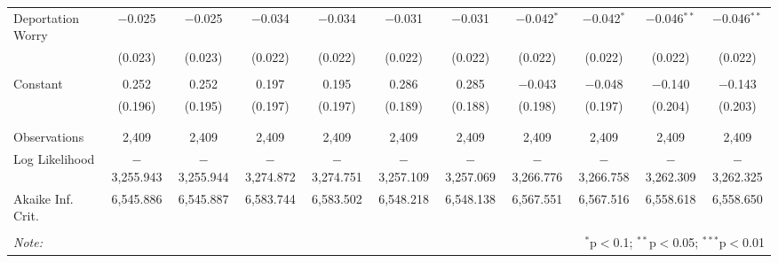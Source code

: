 \begin{table}[!htbp]
\begin{tabular}{@{\extracolsep{5pt}}lcccccccccc}
 Deportation Worry & $-$0.025 & $-$0.025 & $-$0.034 & $-$0.034 & $-$0.031 & $-$0.031 & $-$0.042$^{*}$ & $-$0.042$^{*}$ & $-$0.046$^{**}$ & $-$0.046$^{**}$ \\ 
  & (0.023) & (0.023) & (0.022) & (0.022) & (0.022) & (0.022) & (0.022) & (0.022) & (0.022) & (0.022) \\ 
  & & & & & & & & & & \\ 
 Constant & 0.252 & 0.252 & 0.197 & 0.195 & 0.286 & 0.285 & $-$0.043 & $-$0.048 & $-$0.140 & $-$0.143 \\ 
  & (0.196) & (0.195) & (0.197) & (0.197) & (0.189) & (0.188) & (0.198) & (0.197) & (0.204) & (0.203) \\ 
  & & & & & & & & & & \\ 
\hline \\[-1.8ex] 
Observations & 2,409 & 2,409 & 2,409 & 2,409 & 2,409 & 2,409 & 2,409 & 2,409 & 2,409 & 2,409 \\ 
Log Likelihood & $-$3,255.943 & $-$3,255.944 & $-$3,274.872 & $-$3,274.751 & $-$3,257.109 & $-$3,257.069 & $-$3,266.776 & $-$3,266.758 & $-$3,262.309 & $-$3,262.325 \\ 
Akaike Inf. Crit. & 6,545.886 & 6,545.887 & 6,583.744 & 6,583.502 & 6,548.218 & 6,548.138 & 6,567.551 & 6,567.516 & 6,558.618 & 6,558.650 \\ 
\hline 
\hline \\[-1.8ex] 
\textit{Note:}  & \multicolumn{10}{r}{$^{*}$p$<$0.1; $^{**}$p$<$0.05; $^{***}$p$<$0.01} \\ 
\end{tabular} 
\end{table} 
